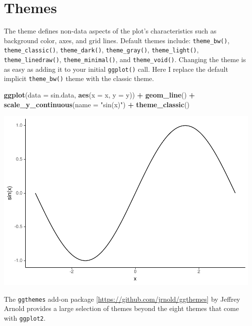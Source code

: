 \documentclass[
]{krantz}
\makeatletter
\newenvironment{Shaded}{\begin{snugshade}}{\end{snugshade}}
\newcommand{\DataTypeTok}[1]{\textcolor[rgb]{0.27,0.27,0.27}{#1}}
\newcommand{\KeywordTok}[1]{\textcolor[rgb]{0.27,0.27,0.27}{\textbf{#1}}}
\newcommand{\NormalTok}[1]{#1}
\newcommand{\OperatorTok}[1]{\textcolor[rgb]{0.43,0.43,0.43}{\textbf{#1}}}
\newcommand{\StringTok}[1]{\textcolor[rgb]{0.5,0.5,0.5}{#1}}
\newenvironment{kframe}{%
\medskip{}
\setlength{\fboxsep}{.8em}
 \def\at@end@of@kframe{}%
 \ifinner\ifhmode%
  \def\at@end@of@kframe{\end{minipage}}%
  \begin{minipage}{\columnwidth}%
 \fi\fi%
 \def\FrameCommand##1{\hskip\@totalleftmargin \hskip-\fboxsep
 \colorbox{shadecolor}{##1}\hskip-\fboxsep
     \hskip-\linewidth \hskip-\@totalleftmargin \hskip\columnwidth}%
 \MakeFramed {\advance\hsize-\width
   \@totalleftmargin\z@ \linewidth\hsize
   \@setminipage}}%
 {\par\unskip\endMakeFramed%
 \at@end@of@kframe}
\renewenvironment{Shaded}{\begin{kframe}}{\end{kframe}}
\makeatother
\begin{document}
\hypertarget{themes}{%
\section{Themes}\label{themes}}

The theme defines non-data aspects of the plot's characteristics such as background color, axes, and grid lines. Default themes include: \texttt{theme\_bw()}, \texttt{theme\_classic()}, \texttt{theme\_dark()}, \texttt{theme\_gray()}, \texttt{theme\_light()}, \texttt{theme\_linedraw()}, \texttt{theme\_minimal()}, and \texttt{theme\_void()}. Changing the theme is as easy as adding it to your initial \texttt{ggplot()} call. Here I replace the default implicit \texttt{theme\_bw()} theme with the classic theme.

\begin{Shaded}
\begin{Highlighting}[]
\KeywordTok{ggplot}\NormalTok{(}\DataTypeTok{data =}\NormalTok{ sin.data, }\KeywordTok{aes}\NormalTok{(}\DataTypeTok{x =}\NormalTok{ x, }\DataTypeTok{y =}\NormalTok{ y)) }\OperatorTok{+}\StringTok{ }\KeywordTok{geom\_line}\NormalTok{() }\OperatorTok{+}\StringTok{ }
\StringTok{    }\KeywordTok{scale\_y\_continuous}\NormalTok{(}\DataTypeTok{name =} \StringTok{"sin(x)"}\NormalTok{) }\OperatorTok{+}
\StringTok{    }\KeywordTok{theme\_classic}\NormalTok{()}
\end{Highlighting}
\end{Shaded}

\includegraphics{bookdown_files/figure-latex/unnamed-chunk-83-1.pdf}

The \texttt{ggthemes} add-on package {[}\url{https://github.com/jrnold/ggthemes}{]} by Jeffrey Arnold provides a large selection of themes beyond the eight themes that come with \texttt{ggplot2}.
\end{document}
